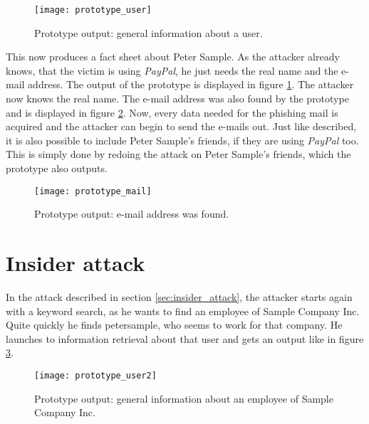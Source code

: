 \begin{figure}[htb]
  \begin{center}
    \texttt{[image: prototype\_user]}
    \caption{Prototype output: general information about a user.}
    \label{fig:prototype_user}
  \end{center}
\end{figure}

This now produces a fact sheet about Peter Sample. As the attacker already
knows, that the victim is using \textit{PayPal}, he just needs the real name
and the e-mail address. The output of the prototype is displayed in figure
\ref{fig:prototype_user}. The attacker now knows the real name. The e-mail
address was also found by the prototype and is displayed in figure
\ref{fig:prototype_mail}. Now, every data needed for the phishing mail is
acquired and the attacker can begin to send the e-mails out. Just like described,
it is also possible to include Peter Sample's friends, if they are using
\textit{PayPal} too. This is simply done by redoing the attack on Peter
Sample's friends, which the prototype also outputs.

\begin{figure}[htb]
  \begin{center}
    \texttt{[image: prototype\_mail]}
    \caption{Prototype output: e-mail address was found.}
    \label{fig:prototype_mail}
  \end{center}
\end{figure}

\section{Insider attack}

In the attack described in section \ref{sec:insider_attack},
the attacker starts again with a keyword search, as he wants to find an
employee of Sample Company Inc. Quite quickly he finds petersample, who seems to work
for that company. He launches to information retrieval about that user and gets
an output like in figure \ref{fig:prototype_user2}.

\begin{figure}[htb]
  \begin{center}
    \texttt{[image: prototype\_user2]}
    \caption{Prototype output: general information about an employee of Sample
    Company Inc.}
    \label{fig:prototype_user2}
  \end{center}
\end{figure}

